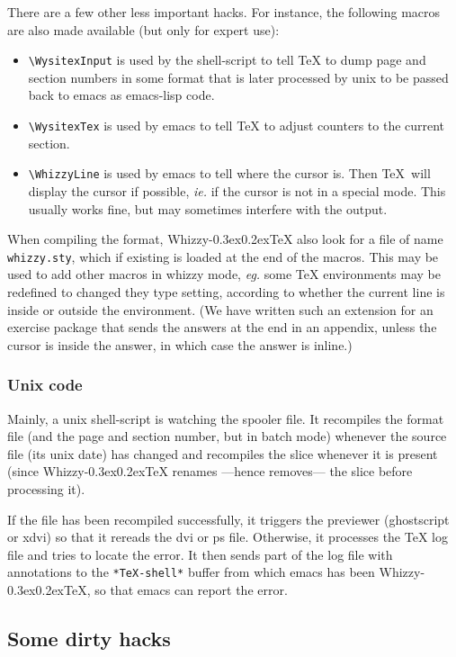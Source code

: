\documentclass{article}
\let \lst \verb
\def \whizzy{{Whizzy\kern -0.3ex\raise 0.2ex\hbox{\TeX}}}
\begin{document}
There are a few other less important hacks. For instance, the following
macros are also made available (but only for expert use):
\begin {itemize}
\item
\lst"\WysitexInput" is used by the shell-script to tell {\TeX} to dump page
and section  numbers in some format that is later processed by unix to be
passed back to emacs as emacs-lisp code.
\item
\lst"\WysitexTex" is used by emacs to tell {\TeX} to adjust counters to
the current section. 
\item
\lst"\WhizzyLine" is used by emacs to tell where the cursor is.
Then \TeX\ will display the cursor if possible, {\em ie.} if the cursor is
not in a special mode. This usually works fine, but may sometimes interfere
with the output. 
\end {itemize}
When compiling the format, {\whizzy} also look for a file of name
\lst"whizzy.sty", which if existing is loaded at the end of the macros. 
This may be used to add other macros in {whizzy} mode, {\em eg.} 
some {\TeX} environments may be redefined to changed they type setting,
according to whether the current line is inside or outside the environment. 
(We have written such an extension for an exercise package that sends the
answers at the end in an appendix, unless the cursor is inside the answer,
in which case the answer is inline.)

\subsubsection* {Unix code}

Mainly, a unix shell-script is watching the spooler file.  It recompiles the
format file (and the page and section number, but in batch mode) whenever
the source file (its unix date) has changed  and 
recompiles the slice whenever it is present (since {\whizzy} renames ---hence
removes--- the slice before processing it).

If the file has been recompiled successfully, it triggers the previewer
(ghostscript or xdvi) so that it rereads the dvi or ps file. Otherwise, it
processes the {\TeX} log file and tries to locate the error. It then sends part
of the log file with annotations to the \lst"*TeX-shell*" buffer from which
emacs has been {\whizzy}, so that emacs can report the error. 


\subsection{Some dirty hacks}
\end{document}
